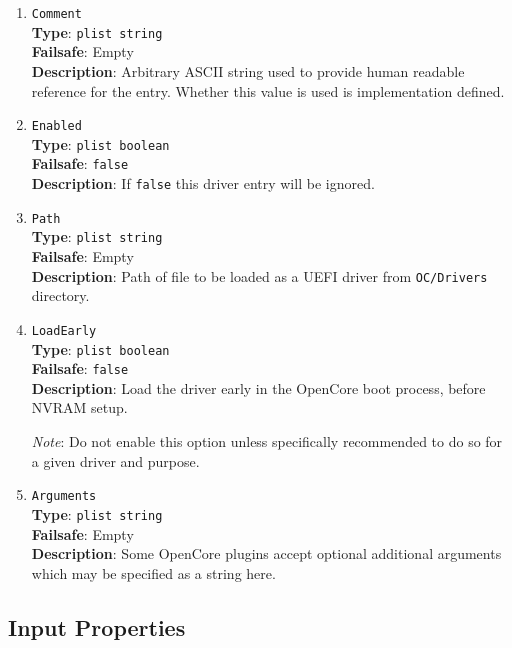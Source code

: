 \documentclass[]{article}
\makeatletter
\renewcommand{\label}[1]{%
\zref@wrapper@immediate{\oldlabel{#1}}}  %
\makeatother
\begin{document}
\begin{enumerate}

\item
  \texttt{Comment}\\
  \textbf{Type}: \texttt{plist\ string}\\
  \textbf{Failsafe}: Empty\\
  \textbf{Description}: Arbitrary ASCII string used to provide human readable
  reference for the entry. Whether this value is used is implementation defined.

\item
  \texttt{Enabled}\\
  \textbf{Type}: \texttt{plist\ boolean}\\
  \textbf{Failsafe}: \texttt{false}\\
  \textbf{Description}: If \texttt{false} this driver entry will be ignored.

\item
  \texttt{Path}\\
  \textbf{Type}: \texttt{plist\ string}\\
  \textbf{Failsafe}: Empty\\
  \textbf{Description}: Path of file to be loaded as a UEFI driver
  from \texttt{OC/Drivers} directory.

\item
  \texttt{LoadEarly}\\
  \textbf{Type}: \texttt{plist\ boolean}\\
  \textbf{Failsafe}: \texttt{false}\\
  \textbf{Description}: Load the driver early in the OpenCore boot process, before NVRAM setup.

  \emph{Note}: Do not enable this option unless specifically recommended to do so for a
  given driver and purpose.

\item
  \texttt{Arguments}\\
  \textbf{Type}: \texttt{plist\ string}\\
  \textbf{Failsafe}: Empty\\
  \textbf{Description}: Some OpenCore plugins accept optional additional arguments
  which may be specified as a string here.

\end{enumerate}


\subsection{Input Properties}\label{uefiinputprops}
\end{document}
